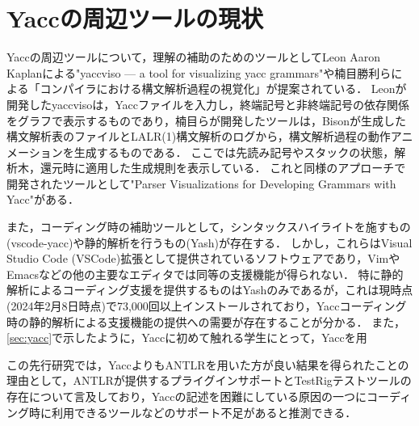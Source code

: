 \documentclass[fontsize=9bp,twocolumn,column_gap=2.36zw,a4paper,report]{jlreq}
\begin{document}
\section{Yaccの周辺ツールの現状}\label{sec:yacc_tools}

Yaccの周辺ツールについて，理解の補助のためのツールとしてLeon Aaron Kaplanによる"yaccviso — a tool for visualizing yacc grammars"\cite{yaccviso}や楠目勝利らによる「コンパイラにおける構文解析過程の視覚化」\cite{parserviso}が提案されている．
Leonが開発したyaccvisoは，Yaccファイルを入力し，終端記号と非終端記号の依存関係をグラフで表示するものであり，楠目らが開発したツールは，Bisonが生成した構文解析表のファイルとLALR(1)構文解析のログから，構文解析過程の動作アニメーションを生成するものである．
ここでは先読み記号やスタックの状態，解析木，還元時に適用した生成規則を表示している．
これと同様のアプローチで開発されたツールとして"Parser Visualizations for Developing Grammars with Yacc"\cite{parserviso2}がある．\par
また，コーディング時の補助ツールとして，シンタックスハイライトを施すもの(vscode-yacc\cite{vscode-yacc})や静的解析を行うもの(Yash\cite{yash})が存在する．
しかし，これらはVisual Studio Code (VSCode)拡張として提供されているソフトウェアであり，VimやEmacsなどの他の主要なエディタでは同等の支援機能が得られない．
特に静的解析によるコーディング支援を提供するものはYashのみであるが，これは現時点(2024年2月8日時点)で73,000回以上インストールされており，Yaccコーディング時の静的解析による支援機能の提供への需要が存在することが分かる．
また，\ref{sec:yacc}で示したように，Yaccに初めて触れる学生にとって，Yaccを用

\begin{figure}[h]
\end{figure}

この先行研究では，YaccよりもANTLRを用いた方が良い結果を得られたことの理由として，ANTLRが提供するプライグインサポートとTestRigテストツールの存在について言及しており，Yaccの記述を困難にしている原因の一つにコーディング時に利用できるツールなどのサポート不足があると推測できる．
\end{document}
